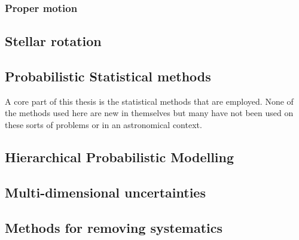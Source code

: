 \subsubsection*{Proper motion}

\subsection*{Stellar rotation}

\subsection*{Probabilistic Statistical methods}

A core part of this thesis is the statistical methods that are employed.
None of the methods used here are new in themselves but many have not been
used on these sorts of problems or in an astronomical context.

\subsection*{Hierarchical Probabilistic Modelling}
\subsection*{Multi-dimensional uncertainties}
\subsection*{Methods for removing systematics}

